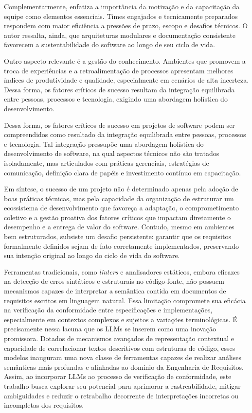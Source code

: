 Complementarmente,  enfatiza a importância da motivação e da capacitação da equipe como elementos essenciais. Times engajados e tecnicamente preparados respondem com maior eficiência a pressões de prazo, escopo e desafios técnicos. O autor ressalta, ainda, que arquiteturas modulares e documentação consistente favorecem a sustentabilidade do software ao longo de seu ciclo de vida.

Outro aspecto relevante é a gestão do conhecimento. Ambientes que promovem a troca de experiências e a retroalimentação de processos apresentam melhores índices de produtividade e qualidade, especialmente em cenários de alta incerteza. Dessa forma, os fatores críticos de sucesso resultam da integração equilibrada entre pessoas, processos e tecnologia, exigindo uma abordagem holística do desenvolvimento.

Dessa forma, os fatores críticos de sucesso em projetos de software podem ser compreendidos como resultado da integração equilibrada entre pessoas, processos e tecnologia. Tal integração pressupõe uma abordagem holística do desenvolvimento de software, na qual aspectos técnicos não são tratados isoladamente, mas articulados com práticas gerenciais, estratégias de comunicação, definição clara de papéis e investimento contínuo em capacitação.

Em síntese, o sucesso de um projeto não é determinado apenas pela adoção de boas práticas técnicas, mas pela capacidade da organização de estruturar um ecossistema de desenvolvimento que favoreça a adaptação, o comprometimento coletivo e a gestão proativa dos fatores críticos que impactam diretamente o desempenho e a entrega de valor do software. Contudo, mesmo em ambientes bem estruturados, subsiste um desafio persistente: garantir que os requisitos formalmente definidos sejam de fato corretamente implementados, preservando sua intenção original ao longo do ciclo de vida do software. 

Ferramentas tradicionais, como \textit{linters} e analisadores estáticos, embora eficazes na detecção de erros sintáticos e estruturais no código-fonte, não possuem mecanismos capazes de interpretar a semântica contida em documentos de requisitos escritos em linguagem natural. Essa limitação compromete sua eficácia na verificação da conformidade entre especificações e implementações, especialmente em contextos complexos e sujeitos a variações terminológicas. É precisamente nessa lacuna que os LLMs se inserem como uma inovação promissora. Dotados de mecanismos avançados de representação contextual e capacidade de correlacionar textos descritivos com estruturas de código, esses modelos inauguram uma nova classe de ferramentas capazes de realizar análises semânticas mais profundas e alinhadas ao domínio da Engenharia de Requisitos. Assim, ao incorporar LLMs ao processo de verificação de conformidade, este trabalho busca explorar seu potencial para aprimorar a rastreabilidade, mitigar ambiguidades e reduzir o retrabalho decorrente de interpretações incorretas ou incompletas dos requisitos.
